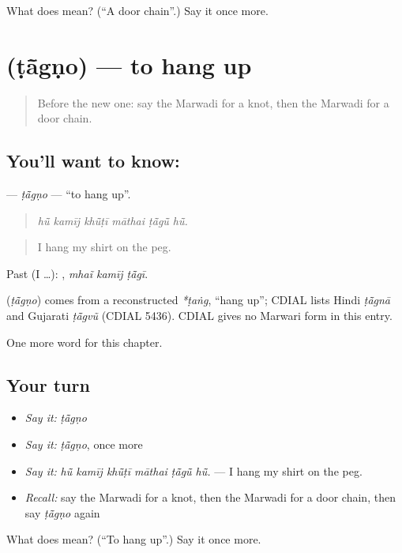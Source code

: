 \begin{tcolorbox}[breakable,colback=teal!4,colframe=teal!35!black,title={Before you move on}]
What does  mean? (\textquotedblleft{}A door chain\textquotedblright{}.) Say it once more.
\end{tcolorbox}
\section[\texorpdfstring{\mw{टांगणो} (ṭā̃gṇo)}{टांगणो (ṭā̃gṇo)}]{ (ṭā̃gṇo) — to hang up}

\label{lesson:MW-C176-tagno}



\begin{quote}
Before the new one: say the Marwadi for a knot, then the Marwadi for a door chain.
\end{quote}

\subsection*{You'll want to know: }
\textbf{} — \emph{ṭā̃gṇo} — \textquotedblleft{}to hang up\textquotedblright{}.

\begin{quote}
     
\end{quote}

\begin{quote}
\emph{hū̃ kamīj khū̃ṭī māthai ṭā̃gū̃ hū̃.}
\end{quote}

\begin{quote}
I hang my shirt on the peg.
\end{quote}

Past (I …):   , \emph{mhaĩ kamīj ṭā̃gī}.

\begin{cousinweb}
\textbf{} (\emph{ṭā̃gṇo}) comes from a reconstructed \emph{*ṭaṅg}, \textquotedblleft{}hang up\textquotedblright{}; CDIAL lists Hindi \emph{ṭā̃gnā} and Gujarati \emph{ṭā̃gvũ} (CDIAL 5436). CDIAL gives no Marwari form in this entry.
\end{cousinweb}

\begin{grammarlens}[title={What you've built}]
One more word for this chapter.
\end{grammarlens}

\subsection*{Your turn}
\begin{itemize}
\raggedright
  \item \emph{Say it:} \emph{ṭā̃gṇo}
  \item \emph{Say it:} \emph{ṭā̃gṇo}, once more
  \item \emph{Say it:} \emph{hū̃ kamīj khū̃ṭī māthai ṭā̃gū̃ hū̃.} — I hang my shirt on the peg.
  \item \emph{Recall:} say the Marwadi for a knot, then the Marwadi for a door chain, then say \emph{ṭā̃gṇo} again
\end{itemize}

\begin{tcolorbox}[breakable,colback=teal!4,colframe=teal!35!black,title={Before you move on}]
What does  mean? (\textquotedblleft{}To hang up\textquotedblright{}.) Say it once more.
\end{tcolorbox}
